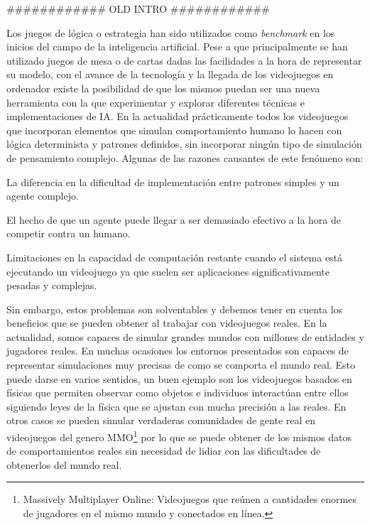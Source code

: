 ############ OLD INTRO ############

Los juegos de lógica o estrategia han sido utilizados como {\it benchmark} en los inicios del campo de la inteligencia artificial. Pese a que principalmente se han utilizado juegos de mesa o de cartas dadas las facilidades a la hora de representar su modelo, con el avance de la tecnología y la llegada de los videojuegos en ordenador existe la posibilidad de que los mismos puedan ser una nueva herramienta con la que experimentar y explorar diferentes técnicas e implementaciones de IA. En la actualidad prácticamente todos los videojuegos que incorporan elementos que simulan comportamiento humano lo hacen con lógica determinista y patrones definidos, sin incorporar ningún tipo de simulación de pensamiento complejo. Algunas de las razones causantes de este fenómeno son:

\begin{itemize}
{\item La diferencia en la dificultad de implementación entre patrones simples y un agente complejo.}
{\item El hecho de que un agente puede llegar a ser demasiado efectivo a la hora de competir contra un humano.}
{\item Limitaciones en la capacidad de computación restante cuando el sistema está ejecutando un videojuego ya que suelen ser aplicaciones significativamente pesadas y complejas.}
\end{itemize}


Sin embargo, estos problemas son solventables y debemos tener en cuenta los beneficios que se pueden obtener al trabajar con videojuegos reales. En la actualidad, somos capaces de simular grandes mundos con millones de entidades y jugadores reales. En muchas ocasiones los entornos presentados son capaces de representar simulaciones muy precisas de como se comporta el mundo real. Esto puede darse en varios sentidos, un buen ejemplo son los videojuegos basados en físicas que permiten observar como objetos e individuos interactúan entre ellos siguiendo leyes de la física que se ajustan con mucha precisión a las reales. En otros casos se pueden simular verdaderas comunidades de gente real en videojuegos del genero MMO\footnote{Massively Multiplayer Online: Videojuegos que reúnen a cantidades enormes de jugadores en el mismo mundo y conectados en línea.} por lo que se puede obtener de los mismos datos de comportamientos reales sin necesidad de lidiar con las dificultades de obtenerlos del mundo real.

